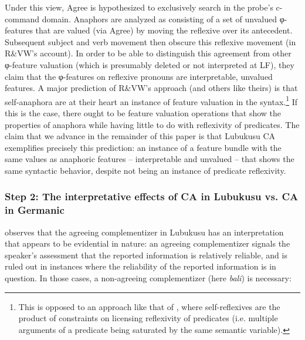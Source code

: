 \documentclass[output=paper
,modfonts
,nonflat
]{langsci/langscibook}
\begin{document}
Under this view, Agree is hypothesized to exclusively search in the probe's c-command domain. Anaphors are analyzed as consisting of a set of unvalued φ-features that are valued (via Agree) by moving the reflexive over its antecedent. Subsequent subject and verb movement then obscure this reflexive movement (in R\&VW’s account). In order to be able to distinguish this agreement from other φ-feature valuation (which is presumably deleted or not interpreted at LF), they claim that the φ-features on reflexive pronouns are interpretable, unvalued features. A major prediction of R\&VW’s approach (and others like theirs) is that self-anaphora are at their heart an instance of feature valuation in the syntax.\footnote{This is opposed to an approach like that of \citet{Reinhart:1993b}, where self-reflexives are the product of constraints on licensing reflexivity of predicates (i.e. multiple arguments of a predicate being saturated by the same semantic variable).}  If this is the case, there ought to be feature valuation operations that show the properties of anaphora while having little to do with reflexivity of predicates. The claim that we advance in the remainder of this paper is that Lubukusu CA exemplifies precisely this prediction: an instance of a feature bundle with the same values as anaphoric features -- interpretable and unvalued -- that shows the same syntactic behavior, despite not being an instance of predicate reflexivity.

\subsubsection{Step 2: The interpretative effects of CA in Lubukusu vs. CA in Germanic}

\citet{Diercks:2010,Diercks:2013} observes that the agreeing complementizer in Lubukusu has an interpretation that appears to be evidential in nature: an agreeing complementizer signals the speaker’s assessment that the reported information is relatively reliable, and is ruled out in instances where the reliability of the reported information is in question.  In those cases, a non-agreeing complementizer (here \textit{bali}) is necessary:
\end{document}
